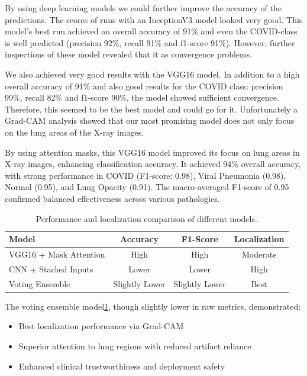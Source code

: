 \documentclass{article}
\begin{document}
By using deep learning models we could further improve the accuracy of the predictions. The scores of runs with an InceptionV3 model looked very good. This model's best run achieved an overall accuracy of 91\% and even the COVID-class is well predicted (precision 92\%, recall 91\% and f1-score 91\%). However, further inspections of these model revealed that it as convergence problems. 

We also achieved very good results with the VGG16 model. In addition to a high overall accuracy of 91\% and also good results for the COVID class: precision 99\%, recall 82\% and f1-score 90\%, the model showed sufficient convergence. Therefore, this seemed to be the best model and could go for it. Unfortunately a Grad-CAM analysis showed that our most promising model does not only focus on the lung areas of the X-ray images. 

By using attention masks, this VGG16 model improved its focus on lung areas in X-ray images, enhancing classification accuracy. It achieved 94\% overall accuracy, with strong performance in COVID (F1-score: 0.98), Viral Pneumonia (0.98), Normal (0.95), and Lung Opacity (0.91). The macro-averaged F1-score of 0.95 confirmed balanced effectiveness across various pathologies.


\begin{table}[hb]
\centering
\begin{tabular}{|l|c|c|c|}
\hline
\textbf{Model} & \textbf{Accuracy} & \textbf{F1-Score} & \textbf{Localization} \\
\hline
VGG16 + Mask Attention & High & High & Moderate \\
\hline
CNN + Stacked Inputs & Lower & Lower & High \\
\hline
Voting Ensemble & Slightly Lower & Slightly Lower & Best \\
\hline
\end{tabular}
\caption{Performance and localization comparison of different models.}
\label{tab:ensemble_performance}
\end{table}

The voting ensemble model\ref{tab:ensemble_performance}, though slightly lower in raw metrics, demonstrated:

\begin{itemize}
  \item Best localization performance via Grad-CAM
  \item Superior attention to lung regions with reduced artifact reliance
  \item Enhanced clinical trustworthiness and deployment safety
\end{itemize}
\end{document}
